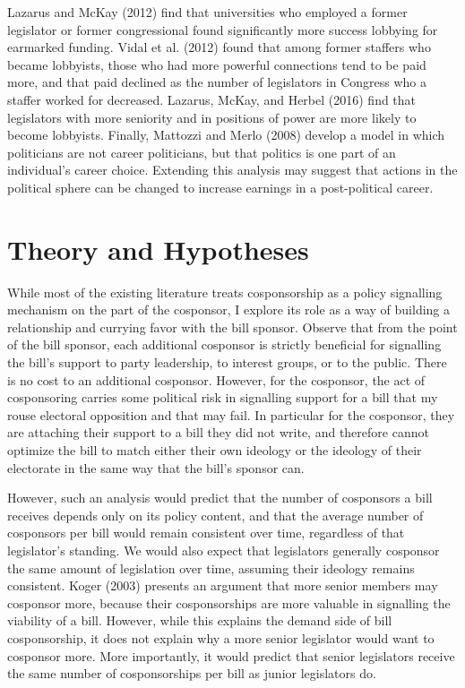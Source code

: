 \documentclass{article}
\begin{document}
Lazarus and McKay (2012) \cite{lazarus_mckay2012} find that universities who employed a former legislator or former congressional found significantly more success lobbying for earmarked funding. Vidal et al. (2012) \cite{vidal2012} found that among former staffers who became lobbyists, those who had more powerful connections tend to be paid more, and that paid declined as the number of legislators in Congress who a staffer worked for decreased. Lazarus, McKay, and Herbel (2016) \cite{lazarus_mckay_herbel2016} find that legislators with more seniority and in positions of power are more likely to become lobbyists. Finally, Mattozzi and Merlo (2008) \cite{mattozzi_merlo2008} develop a model in which politicians are not career politicians, but that politics is one part of an individual's career choice. Extending this analysis may suggest that actions in the political sphere can be changed to increase earnings in a post-political career.

\section{Theory and Hypotheses}
While most of the existing literature treats cosponsorship as a policy signalling mechanism on the part of the cosponsor, I explore its role as a way of building a relationship and currying favor with the bill sponsor. Observe that from the point of the bill sponsor, each additional cosponsor is strictly beneficial for signalling the bill's support to party leadership, to interest groups, or to the public. There is no cost to an additional cosponsor. However, for the cosponsor, the act of cosponsoring carries some political risk in signalling support for a bill that my rouse electoral opposition and that may fail. In particular for the cosponsor, they are attaching their support to a bill they did not write, and therefore cannot optimize the bill to match either their own ideology or the ideology of their electorate in the same way that the bill's sponsor can. 

However, such an analysis would predict that the number of cosponsors a bill receives depends only on its policy content, and that the average number of cosponsors per bill would remain consistent over time, regardless of that legislator's standing. We would also expect that legislators generally cosponsor the same amount of legislation over time, assuming their ideology remains consistent. Koger (2003) \cite{koger2003} presents an argument that more senior members may cosponsor more, because their cosponsorships are more valuable in signalling the viability of a bill. However, while this explains the demand side of bill cosponsorship, it does not explain why a more senior legislator would want to cosponsor more. More importantly, it would predict that senior legislators receive the same number of cosponsorships per bill as junior legislators do.
\end{document}
